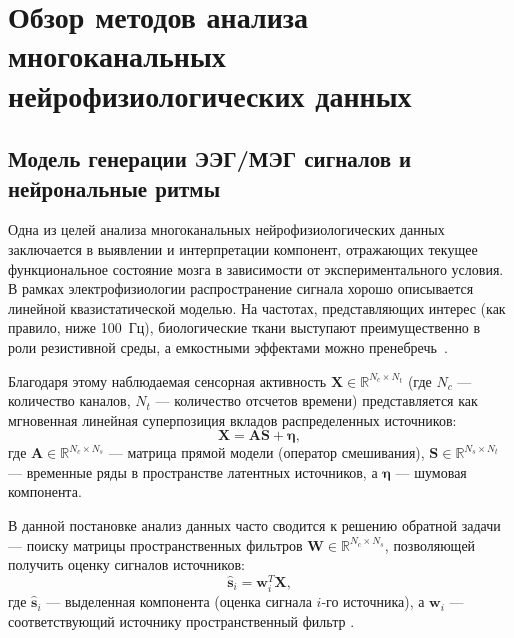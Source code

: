 \chapter{Обзор методов анализа многоканальных нейрофизиологических данных}
\label{ch:literature_review}


\section{Модель генерации ЭЭГ/МЭГ сигналов и нейрональные ритмы}
\label{sec:eeg_generative_model}

Одна из целей анализа многоканальных нейрофизиологических данных заключается в выявлении и интерпретации компонент, отражающих текущее функциональное состояние мозга в зависимости от экспериментального условия. В рамках электрофизиологии распространение сигнала хорошо описывается линейной квазистатической моделью. На частотах, представляющих интерес (как правило, ниже 100~Гц), биологические ткани выступают преимущественно в роли резистивной среды, а емкостными эффектами можно пренебречь~\cite{parra2005recipes, ilmoniemi2019brain, hari2023meg}. 

Благодаря этому наблюдаемая сенсорная активность $\mathbf{X} \in \mathbb{R}^{N_c \times N_t}$ (где $N_c$ --- количество каналов, $N_t$ --- количество отсчетов времени) представляется как мгновенная линейная суперпозиция вкладов распределенных источников:
\begin{equation}
	\mathbf{X} = \mathbf{A}\mathbf{S} + \boldsymbol{\eta},
\end{equation}
где $\mathbf{A} \in \mathbb{R}^{N_c \times N_s}$ --- матрица прямой модели (оператор смешивания), $\mathbf{S} \in \mathbb{R}^{N_s \times N_t}$ --- временные ряды в пространстве латентных источников, а $\boldsymbol{\eta}$ --- шумовая компонента.

В данной постановке анализ данных часто сводится к решению обратной задачи --- поиску матрицы пространственных фильтров $\mathbf{W} \in \mathbb{R}^{N_c \times N_s}$, позволяющей получить оценку сигналов источников:
\begin{equation}
	\hat{\mathbf{s}}_i = \mathbf{w}_i^T \mathbf{X},
\end{equation}
где $\hat{\mathbf{s}}_i$ --- выделенная компонента (оценка сигнала $i$-го источника), а $\mathbf{w}_i$ --- соответствующий источнику пространственный фильтр \cite{parra2005recipes, ilmoniemi2019brain, hari2023meg}.


